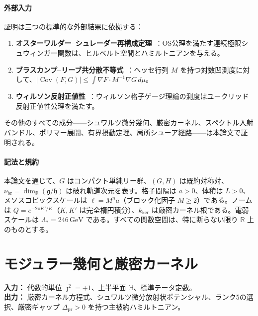 \documentclass[12pt]{article}
\theoremstyle{plain}
\theoremstyle{definition}
\numberwithin{equation}{section}
\newcommand{\R}{\mathbb{R}}
\newcommand{\HH}{\mathbb{H}}
\newcommand{\fg}{\mathfrak{g}}
\newcommand{\fh}{\mathfrak{h}}
\newcommand{\Cov}{\operatorname{Cov}}
\newcommand{\pr}{\mathrm{pr}}
\newcommand{\br}{\mathrm{br}}
\newcommand{\kker}{\mathrm{ker}}
\begin{document}
\subsection*{外部入力}

証明は三つの標準的な外部結果に依拠する：
\begin{enumerate}[label=(\roman*)]
\item \textbf{オスターワルダー--シュレーダー再構成定理}~\cite{OsterwalderSchrader}：OS公理を満たす連続極限シュウィンガー関数は、ヒルベルト空間とハミルトニアンを与える。

\item \textbf{ブラスカンプ--リーブ共分散不等式}~\cite{BrascampLieb}：ヘッセ行列 $M$ を持つ対数凹測度に対して、$|\Cov(F,G)|\leq\int\nabla F\cdot M^{-1}\nabla G\,d\mu$。

\item \textbf{ウィルソン反射正値性}~\cite{WilsonRP}：ウィルソン格子ゲージ理論の測度はユークリッド反射正値性公理を満たす。
\end{enumerate}

その他のすべての成分——シュワルツ微分幾何、厳密カーネル、スペクトル入射バンドル、ポリマー展開、有界摂動定理、局所シューア経路——は本論文で証明される。

\subsection*{記法と規約}

本論文を通じて、$G$ はコンパクト単純リー群、$(G,H)$ は既約対称対、$\nu_{\br}=\dim_\R(\fg/\fh)$ は破れ軌道次元を表す。格子間隔は $a>0$、体積は $L>0$、メソスコピックスケールは $\ell=M^n a$（ブロック化因子 $M\geq 2$）である。ノームは $Q=e^{-2\pi K'/K}$（$K,K'$ は完全楕円積分）、$k_{\kker}$ は厳密カーネル根である。電弱スケールは $\Lambda_*=246\,\mathrm{GeV}$ である。すべての関数空間は、特に断らない限り $\R$ 上のものとする。

\newpage



\part{モジュラー幾何と厳密カーネル}

\noindent\textbf{入力：} 代数的単位 $\jmath^2=+1$、上半平面 $\HH$、標準テータ定数。\\
\textbf{出力：} 厳密カーネル方程式、シュワルツ微分放射状ポテンシャル、ランク5の選択、厳密ギャップ $\Delta_{\pr}>0$ を持つ主被約ハミルトニアン。
\end{document}
